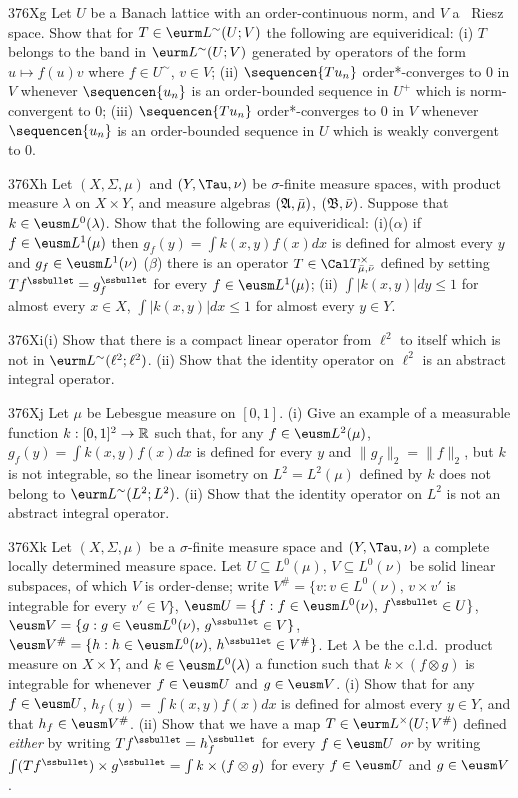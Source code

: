 {\spheader 376Xg Let $U$ be a Banach lattice with an order-continuous
norm, and $V$ a \wsid\ Riesz space.  Show that for $T\in\eurm
L^{\sim}(U;V)$ the following are equiveridical:  (i) $T$ belongs to the
band in $\eurm L^{\sim}(U;V)$ generated by operators of the form
$u\mapsto f(u)v$ where $f\in U^{\sim}$, $v\in V$;  (ii)
$\sequencen{Tu_n}$ order*-converges to $0$ in $V$ whenever
$\sequencen{u_n}$ is
an order-bounded sequence in $U^+$ which is norm-convergent to $0$;
(iii) $\sequencen{Tu_n}$ order*-converges to $0$ in $V$ whenever
$\sequencen{u_n}$ is an order-bounded sequence in $U$ which is weakly
convergent to $0$.

\spheader 376Xh Let $(X,\Sigma,\mu)$ and $(Y,\Tau,\nu)$ be
$\sigma$-finite measure spaces, with product measure $\lambda$ on
$X\times Y$, and measure algebras $(\frak A,\bar\mu)$,
$(\frak B,\bar\nu)$.   Suppose that $k\in\eusm L^0(\lambda)$.   Show
that the
following are equiveridical:  (i)($\alpha$) if $f\in\eusm L^1(\mu)$ then
$g_f(y)=\int k(x,y)f(x)dx$ is defined for almost every $y$ and
$g_f\in\eusm L^1(\nu)$ ($\beta$) there is an operator
$T\in\Cal T^{\times}_{\bar\mu,\bar\nu}$ defined by setting
$Tf^{\ssbullet}=g_f^{\ssbullet}$
for every $f\in \eusm L^1(\mu)$;  (ii) $\int|k(x,y)|dy\le 1$ for almost
every $x\in X$, $\int|k(x,y)|dx\le 1$ for almost every $y\in Y$.

\sqheader 376Xi(i) Show that there is a compact linear operator from
$\ell^2$ to itself which is not in $\eurm L^{\sim}(\ell^2;\ell^2)$.
   (ii) Show that the
identity operator on $\ell^2$ is an abstract integral operator.

\sqheader 376Xj Let $\mu$ be Lebesgue measure on $[0,1]$.   (i) Give an
example of a measurable function $k:[0,1]^2\to\Bbb R$ such that, for any
$f\in\eusm L^2(\mu)$, $g_f(y)=\int k(x,y)f(x)dx$ is defined
for every $y$ and $\|g_f\|_2=\|f\|_2$, but $k$ is not integrable, so the
linear isometry on $L^2=L^2(\mu)$ defined by $k$ does not belong to
$\eurm L^{\sim}(L^2;L^2)$.   (ii) Show that the identity operator on $L^2$
is not an abstract integral operator.

\spheader 376Xk Let $(X,\Sigma,\mu)$ be a $\sigma$-finite measure space
and $(Y,\Tau,\nu)$ a complete locally determined measure space.   Let
$U\subseteq L^0(\mu)$, $V\subseteq L^0(\nu)$ be solid linear subspaces,
of which $V$ is order-dense;  write
$V^{\#}=\{v:v\in L^0(\nu),\,v\times v'$ is integrable for every
$v'\in V\}$,
$\eusm U=\{f:f\in\eusm L^0(\nu),\,f^{\ssbullet}\in U\}$,
$\eusm V=\{g:g\in\eusm L^0(\nu),\,g^{\ssbullet}\in V\}$,
$\eusm V^{\#}=\{h:h\in\eusm L^0(\nu),\,h^{\ssbullet}\in V^{\#}\}$.
Let $\lambda$ be the c.l.d.\ product measure on $X\times Y$, and
$k\in\eusm L^0(\lambda)$ a function such that $k\times(f\otimes g)$ is
integrable for whenever $f\in\eusm U$ and $g\in\eusm V$.
(i) Show that for
any $f\in\eusm U$, $h_f(y)=\int k(x,y)f(x)dx$ is defined for almost
every $y\in Y$, and that $h_f\in\eusm V^{\#}$.   (ii) Show that we have
a map $T\in\eurm L^{\times}(U;V^{\#})$ defined {\it either} by writing
$Tf^{\ssbullet}=h_f^{\ssbullet}$ for every $f\in\eusm U$ {\it or} by
writing
$\int(Tf^{\ssbullet})\times g^{\ssbullet}=\int k\times(f\otimes g)$ for
every $f\in\eusm U$ and $g\in\eusm V$.

}
